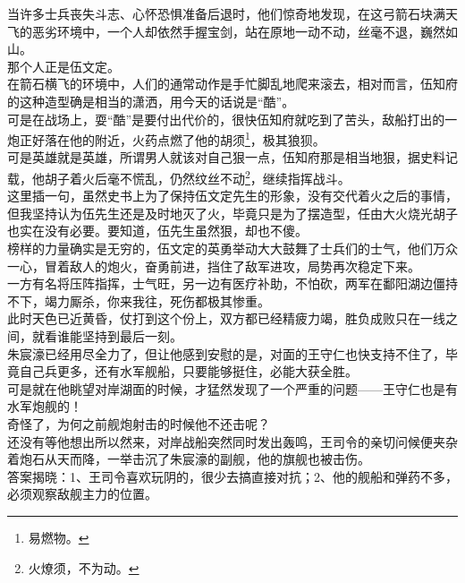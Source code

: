 \begin{multicols}{\theparacolNo}
当许多士兵丧失斗志、心怀恐惧准备后退时，他们惊奇地发现，在这弓箭石块满天飞的恶劣环境中，一个人却依然手握宝剑，站在原地一动不动，丝毫不退，巍然如山。\\

那个人正是伍文定。\\

在箭石横飞的环境中，人们的通常动作是手忙脚乱地爬来滚去，相对而言，伍知府的这种造型确是相当的潇洒，用今天的话说是“酷”。\\

可是在战场上，耍“酷”是要付出代价的，很快伍知府就吃到了苦头，敌船打出的一炮正好落在他的附近，火药点燃了他的胡须\footnote{易燃物。}，极其狼狈。\\

可是英雄就是英雄，所谓男人就该对自己狠一点，伍知府那是相当地狠，据史料记载，他胡子着火后毫不慌乱，仍然纹丝不动\footnote{火燎须，不为动。}，继续指挥战斗。\\

这里插一句，虽然史书上为了保持伍文定先生的形象，没有交代着火之后的事情，但我坚持认为伍先生还是及时地灭了火，毕竟只是为了摆造型，任由大火烧光胡子也实在没有必要。要知道，伍先生虽然狠，却也不傻。\\

榜样的力量确实是无穷的，伍文定的英勇举动大大鼓舞了士兵们的士气，他们万众一心，冒着敌人的炮火，奋勇前进，挡住了敌军进攻，局势再次稳定下来。\\

一方有名将压阵指挥，士气旺，另一边有医疗补助，不怕砍，两军在鄱阳湖边僵持不下，竭力厮杀，你来我往，死伤都极其惨重。\\

此时天色已近黄昏，仗打到这个份上，双方都已经精疲力竭，胜负成败只在一线之间，就看谁能坚持到最后一刻。\\

朱宸濠已经用尽全力了，但让他感到安慰的是，对面的王守仁也快支持不住了，毕竟自己兵更多，还有水军舰船，只要能够挺住，必能大获全胜。\\

可是就在他眺望对岸湖面的时候，才猛然发现了一个严重的问题——王守仁也是有水军炮舰的！\\

奇怪了，为何之前舰炮射击的时候他不还击呢？\\

还没有等他想出所以然来，对岸战船突然同时发出轰鸣，王司令的亲切问候便夹杂着炮石从天而降，一举击沉了朱宸濠的副舰，他的旗舰也被击伤。\\

答案揭晓：1、王司令喜欢玩阴的，很少去搞直接对抗；2、他的舰船和弹药不多，必须观察敌舰主力的位置。\\


\end{multicols}
